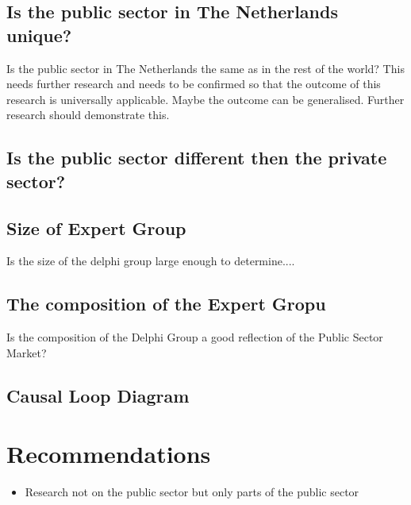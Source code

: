 \subsection{Is the public sector in The Netherlands unique?}
\label{sub:discussionpublicsector}
Is the public sector in The Netherlands the same as in the rest of the world? This needs further research and needs to be confirmed so that the outcome of this research is universally applicable. Maybe the outcome can be generalised. Further research should demonstrate this.

\subsection{Is the public sector different then the private sector?}
\label{sub:discussionpublicvsprivate}


\subsection{Size of Expert Group}
\label{sub:discussionsizeofeg}
Is the size of the delphi group large enough to determine....
\subsection{The composition of the Expert Gropu}
\label{sub:compositionofeg}
Is the composition of the Delphi Group a good reflection of the Public Sector Market?

\subsection{Causal Loop Diagram}

\section{Recommendations}
\label{sec:reccomandations}

\begin{itemize}
	\item{Research not on the public sector but only parts of the public sector}
\end{itemize}